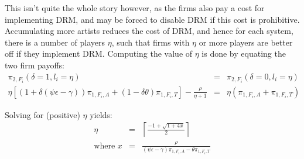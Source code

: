 \documentclass[a4paper,12pt]{article}
\numberwithin{equation}{section}
\newcommand{\firmpayoff}[2]{\pi_{{#1}, F_{#2}}}
\newcommand{\firmalbum}[2]{\pi_{#1, F_{#2}, A}}
\newcommand{\firmticket}[2]{\pi_{#1, F_{#2}, T}}
\newcommand{\drminf}{(\psi \epsilon - \gamma)}
\def\lc{\left\lceil}
\def\rc{\right\rceil}
\begin{document}
This isn't quite the whole story however, as the firms also pay a cost for implementing DRM, and may be forced to disable DRM if this cost is prohibitive. Accumulating more artists reduces the cost of DRM, and hence for each system, there is a number of players $\eta$, such that firms with $\eta$ or more players are better off if they implement DRM. Computing the value of $\eta$ is done by equating the two firm payoffs:
\begin{eqnarray*}
\firmpayoff{2}{i}(\delta = 1, l_i = \eta) & = & \firmpayoff{2}{i}(\delta = 0, l_i = \eta)\\
\eta \left[\left(1 + \delta \drminf\right) \firmalbum{1}{i} + (1 - \delta \theta) \firmticket{1}{i}\right] - \frac{\rho}{\eta + 1} & = & \eta (\firmalbum{1}{i} + \firmticket{1}{i})
\end{eqnarray*}

Solving for (positive) $\eta$ yields:
\begin{eqnarray}
\eta & = & \lc \frac{-1 + \sqrt{1 + 4 x}}{2} \rc \\
\text{where } x & = & \frac{\rho}{\drminf \firmalbum{1}{i} - \theta \firmticket{1}{i}} \nonumber
\end{eqnarray}
\end{document}
